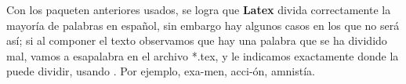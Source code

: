 \documentclass{article}
\begin{document}
Con los paqueten anteriores usados, se logra que \textbf{Latex} divida correctamente la mayoría de palabras en español, sin embargo hay algunos casos en los que no será así; si al componer el texto observamos que hay una palabra que se ha dividido mal, vamos a esapalabra en el archivo *.tex, y le indicamos exactamente donde la puede dividir, usando \-. Por ejemplo, e\-xa-men, ac\-ci-ón, am\-nis\-tí\-a.
\end{document}

